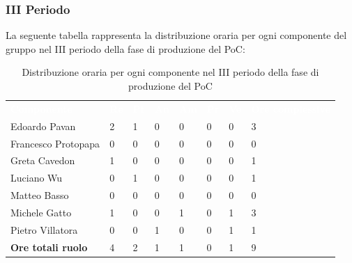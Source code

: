 \subsubsection{III Periodo}
La seguente tabella rappresenta la distribuzione oraria per ogni componente del gruppo nel III periodo della fase di produzione del PoC:
\begin{table}[H]
\begin{center}
\renewcommand{\arraystretch}{1.25}
\begin{tabular}{ m{}<{\centering}  m{}<{\centering} m{}<{\centering} m{}<{\centering}  m{}<{\centering}  m{}<{\centering}  m{}<{\centering}  m{}<{\centering}   }
	\rowcolor{darkblue}
	\textcolor{white}{\textbf{Componente}} &\textcolor{white}{\textbf{Re}}&\textcolor{white}{\textbf{Pt}}&\textcolor{white}{\textbf{An}}&\textcolor{white}{\textbf{Am}}&\textcolor{white}{\textbf{Pr}}&\textcolor{white}{\textbf{Ve}}&\textcolor{white}{\textbf{Ore complessive}}\\ 
	Edoardo Pavan & 2 & 1 & 0 & 0 & 0 & 0 & 3 \\	
	
	Francesco Protopapa & 0 & 0 & 0 & 0 & 0 & 0 & 0 \\

	Greta Cavedon & 1 & 0 & 0 & 0 & 0 & 0 & 1 \\
	
	Luciano Wu & 0 & 1 & 0 & 0 & 0 & 0 & 1\\
	
	Matteo Basso & 0 & 0 & 0 & 0 & 0 & 0 & 0 \\
	
	Michele Gatto &  1 & 0 & 0 & 1 & 0 & 1 & 3\\
	
	Pietro Villatora & 0 & 0 & 1 & 0 & 0 & 1 & 1 \\
	
	\textbf{Ore totali ruolo} & 4 & 2 & 1 & 1 & 0 & 1 & 9\\

\end{tabular}
\caption{Distribuzione oraria per ogni componente nel III periodo della fase di produzione del PoC}
\end{center}
\end{table}

